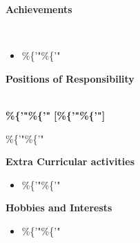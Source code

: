 \documentclass[a4paper,10pt]{article}
\begin{document}
\colorbox{titleColor}{\parbox{6.7in}{\textbf{Achievements}}}\\[0.08in]

    \begin{itemize} 
 \setlength{\itemsep}{1pt}
\item \%\{'"\%\{'"
\end{itemize}

\colorbox{titleColor}{\parbox{6.7in}{\textbf{Positions of Responsibility}}}\\

\textbf{\%\{'"\%\{'"}  \hfill {\small{{\textbf{[\%\{'"\%\{'"]}}}\/} 
\begin{itemize*} 

        \item \%\{'"\%\{'" 

        \end{itemize*}

\colorbox{titleColor}{\parbox{6.7in}{\textbf{Extra Curricular activities}}}

\begin{itemize}

    \setlength{\itemsep}{1pt}
\item \%\{'"\%\{'" \hfill 
\end{itemize}

\colorbox{titleColor}{\parbox{6.7in}{\textbf{Hobbies and Interests}}}

\begin{itemize}
        \setlength{\itemsep}{1pt}
\item \%\{'"\%\{'"
\end{itemize}
\end{document}
